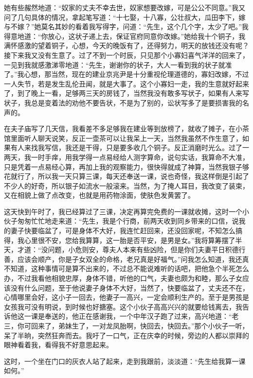 她有些赧然地道：“奴家的丈夫不幸去世，奴家想要改嫁，可是公公不同意。”我又问了几句具体的情况，拿起笔写道：“十七娶，十八寡，公壮叔大，瓜田李下，嫁与不嫁？”她莫名其妙的看着我写得字，问道：“先生，这个几个字，太少了吧。”我得意地道：“你放心，这状子递上去，保证官府同意你改嫁。”她给我十个铜子，我满怀感激的望着铜子，心想，今天的晚饭有了，还得努力，明天的放钱还没有呢？接下来我又没有生意了。过了不到一个时辰，只见那个小寡妇喜气洋洋的回来了，一见到我就感激涕零地道：“先生，谢谢你的状子，大人一看到我的状子就准了。”我心想，那当然，现在的建业京兆尹是十分重视伦理道德的，寡妇改嫁，不过一人失节，若是发生乱伦丑闻，就是大事了。这个小寡妇一走，我的生意就好起来了，到了晚上一看，足够两三天的房钱了，当然我没有敢多写状子，如果有人来写状子，我总是变着法的劝他不要告状，不是为了别的，讼状写多了是要损害我的名声的。

在夫子庙写了几天信，我看差不多足够我在建业等到放榜了，就收了摊子，在小茶馆里面听人聊天说笑，反正一壶茶可以让我呆上一天，当然我虽然不作生意了，如果有人来找我写信，我还是干得，只是要多收几个铜子。反正消磨时光么。过了一两天，我一时手痒，用我学得一点易经给人测字算命，说句实话，我算命不大准，只是凭着一点易经心算，再加上我的观察能力，很快得就成了神算，当然我银子够花就行了，所以我一天只算三课，每天还奉送一课，说也奇怪，我这样倒是引起了不少人的好奇，所以银子如流水一般滚来。当然，为了掩人耳目，我改变了装束，又在相貌上做了点改变，也就是用药物涂面，使肤色发黄罢了。

这天快到午时了，我已经算过了三课，决定再算完免费的一课就收摊，这时一个小伙子匆匆忙忙地走来道：“先生，我是个行商，前两天收到同乡带来的口信，说我的妻子快要临盆了，可是身体不大好，我连忙赶回来，还没回家呢，不知怎么搞得，我心里很不安，您给我算算，这一胎是否平安，是男是女。”我将算筹摆了半天，才道：“没问题，小危则安，尊夫人本来有些凶险，但是你们夫妻平日积德行善，应该会顺产，你是子女双全的命格，老兄真是好福气。”问我怎么知道，我还真不知道，这种事情可是算不出来的，不过总不能说难听的话吧，把他急个半死怎么办，不过我看他相貌忠厚，身体不错，听他的口气，夫妻也颇为和睦，那么子女应该没有什么问题，至于他说妻子身体不大好，当然了，快要临盆了，丈夫还不在，心情哪里会好，这小子一回去，他妻子一高兴，一定会顺利生产的。至于是男孩是女孩我可没有明说，到时候也好搪塞。这个小伙子高高兴兴的就要给钱离去，我告诉他这一课是奉送的，他正在感谢我，一个中年汉子跑了过来，高兴地道：“老三，你可回来了，弟妹生了，一对龙凤胎啊，快回去，快回去。”那个小伙子一听，呆了半晌，突然狂奔而去。我吁了一口气，正在庆幸的时候，旁边的人都以崇拜的眼神看着我，看得我不好意思起来。

这时，一个坐在门口的灰衣人站了起来，走到我跟前，淡淡道：“先生给我算一课如何。”

